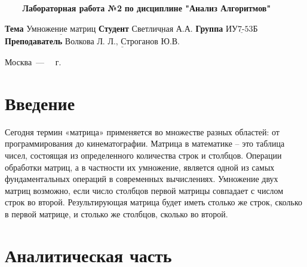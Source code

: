 \documentclass[a4paper,14pt, unknownkeysallowed]{extreport}
\begin{document}
\begin{titlepage}
	
	\begin{center}
		\noindent\begin{minipage}{1.3\textwidth}\centering
		\Large\textbf{   ~~~ Лабораторная работа №2}\newline
		\textbf{по дисциплине "Анализ Алгоритмов"}\newline\newline\newline
		\end{minipage}
	\end{center}
	
	\noindent\textbf{Тема} 			$\underline{\text{Умножение матриц}}$\newline\newline
	\noindent\textbf{Студент} 		$\underline{\text{Светличная А.А.}}$\newline\newline
	\noindent\textbf{Группа} 		$\underline{\text{ИУ7-53Б}}$\newline\newline
	\noindent\textbf{Преподаватель} $\underline{\text{Волкова Л. Л., Строганов Ю.В.}}$\newline
	
	\begin{center}
		\vfill
		Москва~---~\the\year
		~г.
	\end{center}
	\restoregeometry
\end{titlepage}
	
	\setcounter{page}{2}
	\tableofcontents
	
	\newpage
	\chapter*{Введение}
	
Сегодня термин «матрица» применяется во множестве разных областей: от
программирования до кинематографии. Матрица в математике – это таблица чисел, состоящая из определенного количества строк и столбцов. 
Операции обработки матриц, а в частности их умножение, является одной из самых фундаментальных операций в современных вычислениях. Умножение двух матриц возможно, если число столбцов первой матрицы совпадает с числом строк во второй. Результирующая матрица будет иметь столько же строк, сколько в первой матрице, и столько же столбцов, сколько во второй.
	
\chapter{Аналитическая часть}
	
\end{document}
